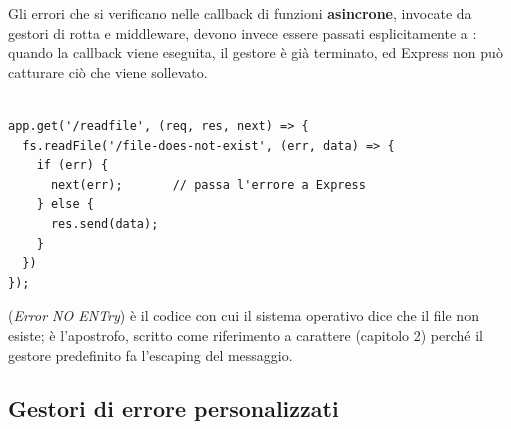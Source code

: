 Gli errori che si verificano nelle callback di funzioni \textbf{asincrone},
invocate da gestori di rotta e middleware, devono invece essere passati
esplicitamente a : quando la callback viene eseguita, il gestore
è già terminato, ed Express non può catturare ciò che viene sollevato.

\begin{affianco}[0.5][c]
\begin{lstlisting}[style=js, name=errors.js, firstnumber=9]

app.get('/readfile', (req, res, next) => {
  fs.readFile('/file-does-not-exist', (err, data) => {
    if (err) {
      next(err);       // passa l'errore a Express
    } else {
      res.send(data);
    }
  })
});
\end{lstlisting}
\risultato
\begin{immagine}
\end{immagine}
\end{affianco}


 (\textit{Error NO ENTry}) è il codice con cui il sistema
operativo dice che il file non esiste;  è l'apostrofo, scritto
come riferimento a carattere (capitolo 2) perché il gestore predefinito fa
l'escaping del messaggio.

\subsection{Gestori di errore personalizzati}

